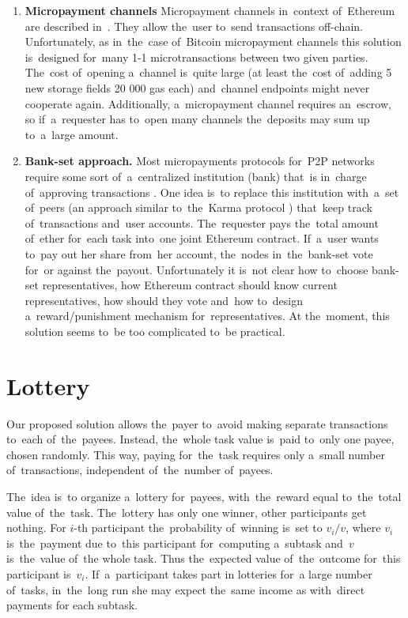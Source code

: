 \documentclass[a4paper]{article}
\begin{document}
    \begin{enumerate}
	    \item \textbf{Micropayment channels}
        Micropayment channels in~context of~Ethereum are described in~\cite{BUTERIN}. They allow the~user to~send
        transactions off-chain. Unfortunately, as in~the~case of~Bitcoin micropayment channels \cite{BITCOINJ} this
        solution is~designed for~many 1-1 microtransactions between two given parties. The~cost of~opening a~channel
        is~quite large (at least the~cost of~adding 5 new storage fields 20 000 gas each) and~channel endpoints might
        never cooperate again. Additionally, a~micropayment channel requires an~escrow, so if~a~requester has to~open
        many channels the~deposits may sum up to~a~large amount.
	\item \textbf{Bank-set approach.}
        Most micropayments protocols for~P2P networks require some sort of~a~centralized institution (bank) that~is
        in~charge of~approving transactions \cite{JAIN}. One idea is~to replace this institution with~a~set of~peers
        (an approach similar to~the~Karma protocol \cite{VISHNUMURTHY}) that~keep track of~transactions and~user accounts.
        The~requester pays the~total amount of~ether for~each task into~one joint Ethereum contract.
        If~a~user wants to~pay out her share from~her account, the~nodes in~the~bank-set vote for~or against the~payout.
        Unfortunately it is~not clear how to~choose bank-set representatives, how Ethereum contract should know
        current representatives, how should they vote and~how to~design a~reward/punishment mechanism
        for~representatives. At the~moment, this solution seems to~be too complicated to~be practical.

\end{enumerate}
\section{Lottery}
\label{sec:lottery}

    Our proposed solution allows the~payer to~avoid making separate transactions to~each of~the~payees. Instead,
    the~whole task value is~paid to~only one payee, chosen randomly. This way, paying for~the~task requires only
    a~small number of~transactions, independent of~the~number of~payees.

    The~idea is~to organize a~lottery for~payees, with~the~reward equal to~the~total value of~the~task. The~lottery
    has only one winner, other participants get nothing. For $i$-th participant the~probability of~winning is~set to
    $v_i / v$, where $v_i$ is~the~payment due to~this participant for~computing a~subtask and~$v$ is~the~value of~the
    whole task. Thus the~expected value of~the~outcome for~this participant is~$v_i$. If~a~participant takes part in
    lotteries for~a large number of~tasks, in~the~long run she may expect the~same income as with~direct payments for
    each subtask.
\end{document}
